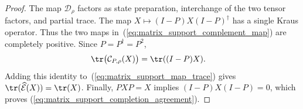 \begin{proof}\leanok

    The map $\mathcal D_\rho$ factors as state preparation, interchange of
    the two tensor factors, and partial trace.  The map
    $X\mapsto(I-P)X(I-P)^\dagger$ has a single Kraus operator.  Thus the two
    maps in~(\ref{eq:matrix_support_complement_map}) are completely positive.
    Since $P=P^\dagger=P^2$,
    \begin{align}
        \tr\bigl(\mathcal C_{P,\rho}(X)\bigr)
         & =\tr((I-P)X).
        \notag
    \end{align}
    Adding this identity to~(\ref{eq:matrix_support_map_trace}) gives
    $\tr(\widehat{\mathcal E}(X))=\tr(X)$.  Finally, $PXP=X$ implies
    $(I-P)X(I-P)=0$, which proves
    (\ref{eq:matrix_support_completion_agreement}).
\end{proof}

